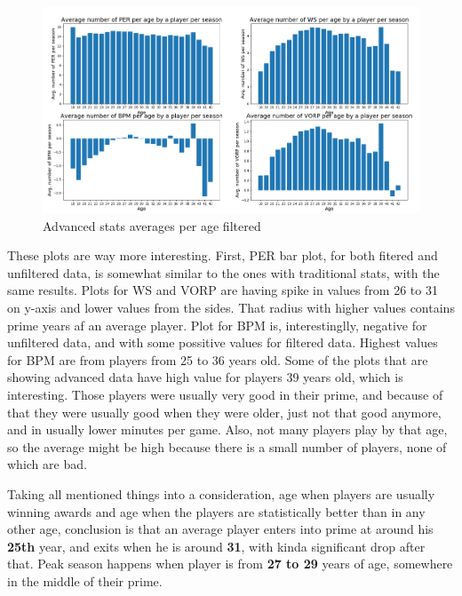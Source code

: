 \documentclass[a4paper]{article}
\begin{document}
\begin{figure}[h!]
\begin{center}
\includegraphics[scale=0.3]{advanced_stats_per_age_filtered.png}
\end{center}
\caption{Advanced stats averages per age filtered}
\label{plt:advanced_age_filtered}
\end{figure}

These plots are way more interesting. First, PER bar plot, for both fitered and unfiltered data, is somewhat similar to the ones with traditional stats, with the same results. Plots for WS and VORP are having spike in values from 26 to 31 on y-axis and lower values from the sides. That radius with higher values contains prime years af an average player. Plot for BPM is, interestinglly, negative for unfiltered data, and with some possitive values for filtered data. Highest values for BPM are from players from 25 to 36 years old. Some of the plots that are showing advanced data have high value for players 39 years old, which is interesting. Those players were usually very good in their prime, and because of that they were usually good when they were older, just not that good anymore, and in usually lower minutes per game. Also, not many players play by that age, so the average might be high because there is a small number of players, none of which are bad.

Taking all mentioned things into a consideration, age when players are usually winning awards and age when the players are statistically better than in any other age, conclusion is that an average player enters into prime at around his \textbf{25th} year, and exits when he is around \textbf{31}, with kinda significant drop after that. Peak season happens when player is from \textbf{27 to 29} years of age, somewhere in the middle of their prime.
\end{document}
